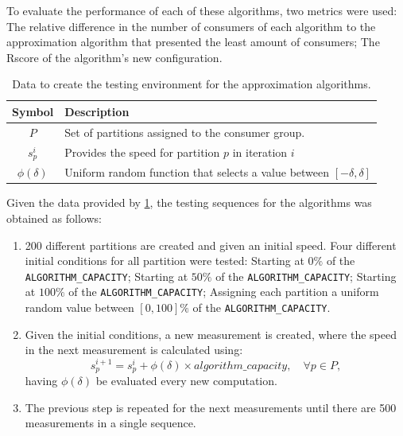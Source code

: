 To evaluate the performance of each of these algorithms, two metrics were used:
    The relative difference in the number of consumers of each algorithm to the
    approximation algorithm that presented the least amount of consumers; The
    Rscore of the algorithm's new configuration.

\begin{table}[H] \centering \caption{Data to create the testing environment for
    the approximation algorithms.} \label{table:testing_data} \begin{tabular}{
            |c|l| } \hline \textbf{Symbol} & \textbf{Description} \\ \hline $P$
        & Set of partitions assigned to the consumer group. \\ $s_p^i$ &
    Provides the speed for partition $p$ in iteration $i$ \\ $\phi(\delta)$ &
    Uniform random function that selects a value between $[-\delta, \delta]$\\
    \hline \end{tabular} \end{table}

Given the data provided by \ref{table:testing_data}, the testing sequences for
the algorithms was obtained as follows: \begin{enumerate} \item 200 different
            partitions are created and given an initial speed. Four different
            initial conditions for all partition were tested: Starting at $0\%$
            of the \lstinline[language=Python]{ALGORITHM_CAPACITY}; Starting at
            $50\%$ of the \lstinline[language=Python]{ALGORITHM_CAPACITY};
            Starting at $100\%$ of the
            \lstinline[language=Python]{ALGORITHM_CAPACITY}; Assigning each
            partition a uniform random value between $[0, 100]\%$ of the
            \lstinline[language=Python]{ALGORITHM_CAPACITY}.
    
    \item Given the initial conditions, a new measurement is created, where the
        speed in the next measurement is calculated using: \begin{equation}
        s_p^{i+1} = s_p^i + \phi(\delta) \times algorithm\_capacity, \quad
        \forall p \in P, \end{equation} having $\phi(\delta)$ be evaluated every
        new computation.
    
    \item The previous step is repeated for the next measurements until there
are 500 measurements in a single sequence.  \end{enumerate}

